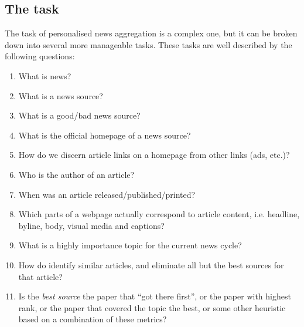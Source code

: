 \subsection{The task\label{task}}
The task of personalised news aggregation is a complex one, but it can
be broken down into several more manageable tasks.  These tasks are
well described by the following questions:
\begin{enumerate}
    \item What is news?
    \item What is a news source?
    \item What is a good/bad news source?
    \item What is the official homepage of a news source?
    \item How do we discern article links on a homepage from other
          links (ads, etc.)?
    \item Who is the author of an article?
    \item When was an article released/published/printed?
    \item Which parts of a webpage actually correspond to article content,
          i.e. headline, byline, body, visual media and captions?
    \item What is a highly importance topic for the current
          news cycle?
    \item How do identify similar articles, and eliminate all but the best
          sources for that article?
    \item Is the {\it best source} the paper that ``got there first'', or
          the paper with highest rank, or the paper that covered the
          topic the best, or some other heuristic based on a
          combination of these metrics?
\end{enumerate}